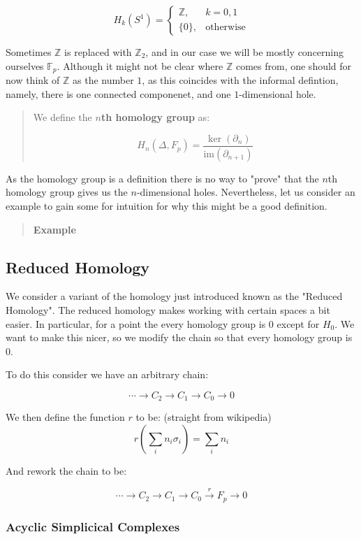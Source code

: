 \documentclass[letterpaper,12pt]{article}
\newcommand{\lra}{\longrightarrow}
\begin{document}
$$H_k(S^1) =
\begin{cases}
    \mathbb{Z}, & k = 0, 1 \\
    \{ 0 \}, & \text{otherwise}
\end{cases}
$$

Sometimes $\mathbb{Z}$ is replaced with $\mathbb{Z}_2$, and in our case we will be mostly concerning ourselves $\mathbb{F}_p$. Although it might not be clear where $\mathbb{Z}$ comes from, one should for now think of $\mathbb{Z}$ as the number $1$, as this coincides with the informal defintion, namely, there is one connected componenet, and one $1$-dimensional hole.

\begin{quote}
    We define the $n$\textbf{th homology group} as:

    $$H_n(\Delta, F_p) = \frac{\ker(\partial_n)}{\text{im}(\partial_{n+1})}$$
\end{quote}

As the homology group is a definition there is no way to "prove" that the $n$th homology group gives us the $n$-dimensional holes. Nevertheless, let us consider an example to gain some for intuition for why this might be a good definition.

\begin{quote}
    \textbf{Example}
\end{quote}

\subsection{Reduced Homology}

We consider a variant of the homology just introduced known as the "Reduced Homology". The reduced homology makes working with certain spaces a bit easier. In particular, for a point the every homology group is $0$ except for $H_0$. We want to make this nicer, so we modify the chain so that every homology group is $0$.

To do this consider we have an arbitrary chain:

$$\cdots \lra C_2 \lra C_1 \lra C_0 \lra 0$$

We then define the function $r$ to be: (straight from wikipedia)
$$r\left(\sum_i n_i \sigma_i\right) = \sum_i n_i$$

And rework the chain to be:

$$\cdots \rightarrow C_2 \rightarrow C_1 \rightarrow C_0 \xrightarrow{r} F_p \rightarrow 0$$

\subsubsection{Acyclic Simplicical Complexes}
\end{document}
